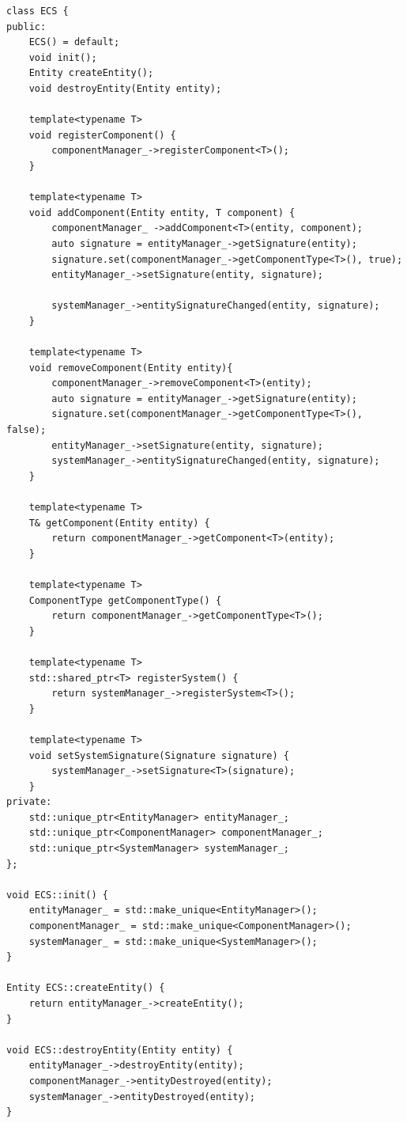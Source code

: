 \newpage
\begin{lstlisting}
class ECS {
public:
    ECS() = default;
    void init();
    Entity createEntity();
    void destroyEntity(Entity entity);

    template<typename T>
    void registerComponent() {
        componentManager_->registerComponent<T>();
    }

    template<typename T>
    void addComponent(Entity entity, T component) {
        componentManager_ ->addComponent<T>(entity, component);
        auto signature = entityManager_->getSignature(entity);
        signature.set(componentManager_->getComponentType<T>(), true);
        entityManager_->setSignature(entity, signature);

        systemManager_->entitySignatureChanged(entity, signature);
    }

    template<typename T>
    void removeComponent(Entity entity){
        componentManager_->removeComponent<T>(entity);
        auto signature = entityManager_->getSignature(entity);
        signature.set(componentManager_->getComponentType<T>(), false);
        entityManager_->setSignature(entity, signature);
        systemManager_->entitySignatureChanged(entity, signature);
    }

    template<typename T>
    T& getComponent(Entity entity) {
        return componentManager_->getComponent<T>(entity);
    }

    template<typename T>
    ComponentType getComponentType() {
        return componentManager_->getComponentType<T>();
    }

    template<typename T>
    std::shared_ptr<T> registerSystem() {
        return systemManager_->registerSystem<T>();
    }

    template<typename T>
    void setSystemSignature(Signature signature) {
        systemManager_->setSignature<T>(signature);
    }
private:
    std::unique_ptr<EntityManager> entityManager_;
    std::unique_ptr<ComponentManager> componentManager_;
    std::unique_ptr<SystemManager> systemManager_;
};

void ECS::init() {
    entityManager_ = std::make_unique<EntityManager>();
    componentManager_ = std::make_unique<ComponentManager>();
    systemManager_ = std::make_unique<SystemManager>();
}

Entity ECS::createEntity() {
    return entityManager_->createEntity();
}

void ECS::destroyEntity(Entity entity) {
    entityManager_->destroyEntity(entity);
    componentManager_->entityDestroyed(entity);
    systemManager_->entityDestroyed(entity);
}
\end{lstlisting}

